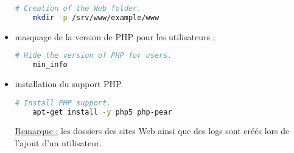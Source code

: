 \begin{itemize}
\begin{lstlisting}[language=bash]
    # Creation of the Web folder.
    mkdir -p /srv/www/example/www
  \end{lstlisting}

\item masquage de la version de PHP pour les utilisateurs ;

  \begin{lstlisting}[language=bash]
    # Hide the version of PHP for users.
    min_info
  \end{lstlisting}

\item installation du support PHP.

  \begin{lstlisting}[language=bash]
    # Install PHP support.
    apt-get install -y php5 php-pear
  \end{lstlisting}

\underline{Remarque :} les dossiers des sites Web ainsi que des logs sont créés
lors de l'ajout d'un utilisateur.
\end{itemize}


